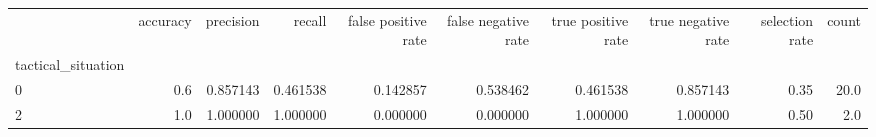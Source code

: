 \begin{tabular}{lrrrrrrrrr}
\toprule
{} &  accuracy &  precision &    recall &  false positive rate &  false negative rate &  true positive rate &  true negative rate &  selection rate &  count \\
tactical\_situation &           &            &           &                      &                      &                     &                     &                 &        \\
\midrule
0                  &       0.6 &   0.857143 &  0.461538 &             0.142857 &             0.538462 &            0.461538 &            0.857143 &            0.35 &   20.0 \\
2                  &       1.0 &   1.000000 &  1.000000 &             0.000000 &             0.000000 &            1.000000 &            1.000000 &            0.50 &    2.0 \\
\bottomrule
\end{tabular}
